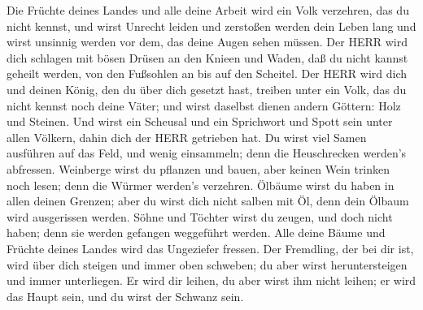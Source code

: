  Die Früchte deines Landes und alle deine Arbeit wird ein
Volk verzehren, das du nicht kennst, und wirst Unrecht leiden und
zerstoßen werden dein Leben lang  und wirst unsinnig werden
vor dem, das deine Augen sehen müssen.  Der HERR wird dich
schlagen mit bösen Drüsen an den Knieen und Waden, daß du nicht kannst
geheilt werden, von den Fußsohlen an bis auf den Scheitel. 
Der HERR wird dich und deinen König, den du über dich gesetzt hast,
treiben unter ein Volk, das du nicht kennst noch deine Väter; und wirst
daselbst dienen andern Göttern: Holz und Steinen.  Und
wirst ein Scheusal und ein Sprichwort und Spott sein unter allen
Völkern, dahin dich der HERR getrieben hat.  Du wirst viel
Samen ausführen auf das Feld, und wenig einsammeln; denn die
Heuschrecken werden's abfressen.  Weinberge wirst du
pflanzen und bauen, aber keinen Wein trinken noch lesen; denn die Würmer
werden's verzehren.  Ölbäume wirst du haben in allen deinen
Grenzen; aber du wirst dich nicht salben mit Öl, denn dein Ölbaum wird
ausgerissen werden.  Söhne und Töchter wirst du zeugen, und
doch nicht haben; denn sie werden gefangen weggeführt werden.
 Alle deine Bäume und Früchte deines Landes wird das
Ungeziefer fressen.  Der Fremdling, der bei dir ist, wird
über dich steigen und immer oben schweben; du aber wirst heruntersteigen
und immer unterliegen.  Er wird dir leihen, du aber wirst
ihm nicht leihen; er wird das Haupt sein, und du wirst der Schwanz sein.

